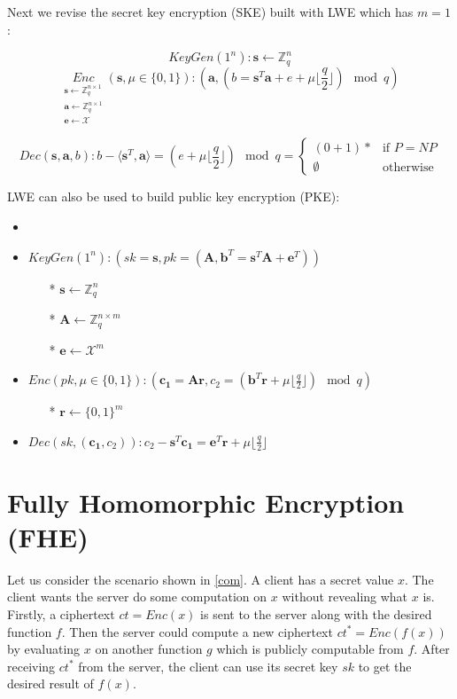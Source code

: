 \documentclass[usletter]{article}
\begin{document}
Next we revise the secret key encryption (SKE) built with LWE which has $m=1$:

$$KeyGen(1^n): \pmb{s}\leftarrow\mathbb{Z}_q^n$$
$$\underset{\substack{
\pmb{s}\leftarrow \mathbb{Z}_q^{n\times1}\\
\pmb{a}\leftarrow\mathbb{Z}_q^{n\times 1}\\
\pmb{e}\leftarrow \mathcal{X}}}{Enc}(\pmb{s},\mu\in\{0,1\}): (\pmb{a}, (b = \pmb{s}^T\pmb{a}+e+\mu\lfloor\frac{q}{2}\rfloor)\mod q)$$


$$Dec(\pmb{s},\pmb{a},b): b-\langle\pmb{s}^T,\pmb{a}\rangle=(e+\mu\lfloor\frac{q}{2}\rfloor) \mod q =   
  \begin{cases}
    (0 + 1)* & \text{if $P = \mathit{NP}$} \\
    \emptyset & \text{otherwise}
  \end{cases}$$

LWE can also be used to build public key encryption (PKE):
\begin{itemize}
\item \item $KeyGen(1^n): (sk=\pmb{s},pk=(\pmb{A}, \pmb{b}^T=\pmb{s}^T\pmb{A}+\pmb{e}^T))$
\begin{itemize}
\item[*]  $\pmb{s}\leftarrow\mathbb{Z}_q^n$
\item[*] $\pmb{A}\leftarrow\mathbb{Z}_q^{n\times m}$
\item[*] $\pmb{e}\leftarrow\mathcal{X}^m$
\end{itemize}

\item $Enc(pk,\mu\in\{0,1\}): (\pmb{c_1}=\pmb{A}\pmb{r}, c_2=(\pmb{b}^T\pmb{r}+\mu\lfloor\frac{q}{2}\rfloor)\mod q)$
\begin{itemize}
\item[*]  $\pmb{r}\longleftarrow\{0,1\}^m$
\end{itemize}

\item $Dec(sk,(\pmb{c_1},c_2)): c_2-\pmb{s}^T\pmb{c_1}=\pmb{e}^T\pmb{r}+\mu\lfloor\frac{q}{2}\rfloor$
\end{itemize}


\section{Fully Homomorphic Encryption (FHE)}

Let us consider the scenario shown in \ref{com}. A client has a secret value $x$. The client wants the server do some computation on $x$ without revealing what $x$ is. Firstly, a ciphertext $ct=Enc(x)$ is sent to the server along with the desired function $f$. Then the server could compute a new ciphertext $ct^*=Enc(f(x))$ by evaluating $x$ on another function $g$ which is publicly computable from $f$. After receiving $ct^*$ from the server, the client can use its secret key $sk$ to get the desired result of $f(x)$.
\end{document}
